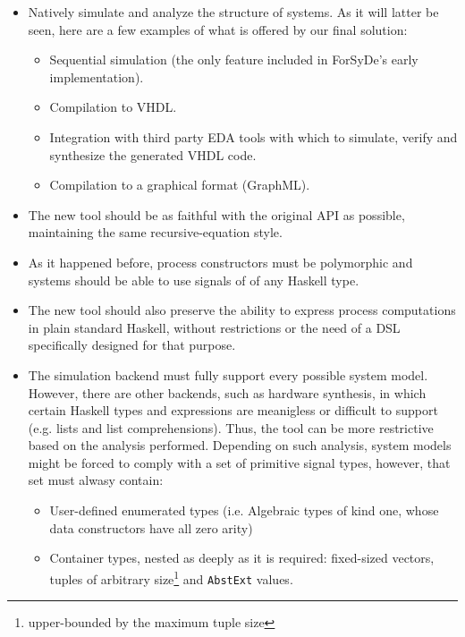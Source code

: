 \begin{itemize}
\item Natively simulate and analyze the structure of systems. As it
  will latter be seen, here are a few examples of what is offered by
  our final solution:
  \begin{itemize}
    \item Sequential simulation (the only feature included in
      ForSyDe's early implementation).
    \item Compilation to VHDL.
    \item Integration with third party EDA tools with which to
      simulate, verify and synthesize the generated VHDL code.
    \item Compilation to a graphical format (GraphML).
  \end{itemize}
\item The new tool should be as faithful with the original API as
  possible, maintaining the same recursive-equation style.
\item As it happened before, process constructors must be
  polymorphic and systems should be able to use signals of
  of any Haskell type.
\item The new tool should also preserve the ability to express 
  process computations in plain standard Haskell, without
  restrictions or the need of a DSL specifically designed for that purpose.
\item The simulation backend must fully support every possible system
  model. However, there are other backends, such as hardware
  synthesis, in which certain Haskell types and expressions are
  meanigless or difficult to support (e.g. lists and list
  comprehensions). Thus, the tool can be more restrictive based on the
  analysis performed. Depending on such analysis, system models might
  be forced to comply with a set of primitive signal types, however, that
  set must alwasy contain:
  \begin{itemize}
  \item User-defined enumerated types
    (i.e. Algebraic types of kind one, whose data constructors have all
    zero arity)
  \item Container types, nested as deeply as it is
    required: fixed-sized vectors, tuples of arbitrary
    size\footnote{upper-bounded by the maximum tuple size} and
    \texttt{AbstExt} values.
  \end{itemize}
  

\end{itemize}
